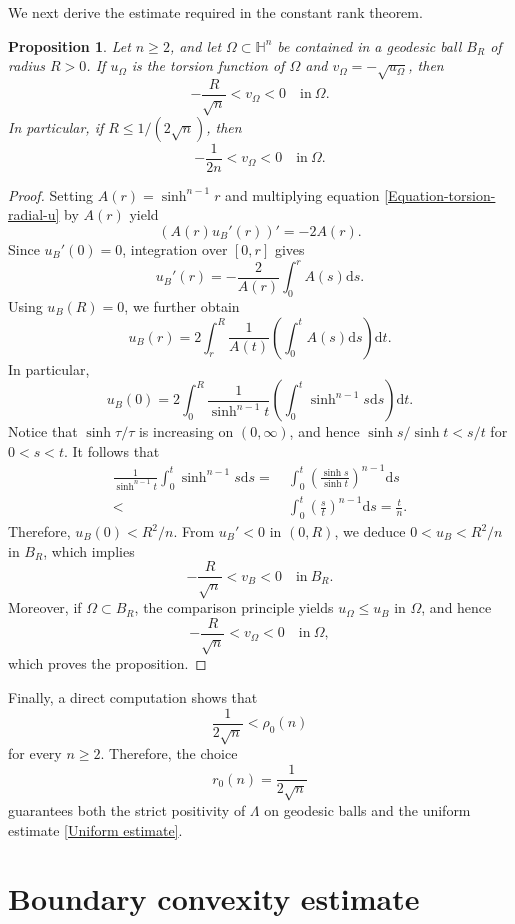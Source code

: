 \documentclass[11pt]{amsart}
\newcommand{\dd}{\mathrm{d}}
\newtheorem{proposition}[theorem]{Proposition}
\numberwithin{theorem}{section}
\numberwithin{equation}{section}
\begin{document}
We next derive the estimate required in the constant rank theorem.
\begin{proposition}\label{Proposition-uniform estimate}
Let $n\geq 2$, and let $\Omega\subset\mathbb{H}^n$ be contained in a geodesic ball $B_R$ of radius $R>0$. If $u_\Omega$ is the torsion function of $\Omega$ and $v_\Omega=-\sqrt{u_\Omega}$, then $$-\frac{R}{\sqrt{n}}<v_\Omega<0\quad\mathrm{in}\ \Omega.$$ In particular, if $R\leq 1/(2\sqrt{n})$, then
\begin{equation}\label{Uniform estimate}
-\frac{1}{2n}<v_\Omega<0\quad\mathrm{in}\ \Omega.
\end{equation}
\end{proposition}
\begin{proof}
Setting $A(r)=\sinh^{n-1}r$ and multiplying equation \eqref{Equation-torsion-radial-u} by $A(r)$ yield $$(A(r)u_B'(r))'=-2A(r).$$ Since $u_B'(0)=0$, integration over $[0,r]$ gives $$u_B'(r)=-\frac{2}{A(r)}\int_0^rA(s)\dd s.$$ Using $u_B(R)=0$, we further obtain $$u_B(r)=2\int_r^R\frac{1}{A(t)}\left(\int_0^tA(s)\dd s\right)\dd t.$$ In particular, $$u_B(0)=2\int_0^R\frac{1}{\sinh^{n-1}t}\left(\int_0^t\sinh^{n-1}s\dd s\right)\dd t.$$ Notice that $\sinh\tau/\tau$ is increasing on $(0,\infty)$, and hence $\sinh s/\sinh t<s/t$ for $0<s<t$. It follows that
\begin{align*}
\frac{1}{\sinh^{n-1}t}\int_0^t\sinh^{n-1}s\dd s
=&~\int_0^t\left(\frac{\sinh s}{\sinh t}\right)^{n-1}\dd s\\
<&~\int_0^t\left(\frac{s}{t}\right)^{n-1}\dd s=\frac{t}{n}.
\end{align*}
Therefore, $u_B(0)<R^2/n$. From $u_B'<0$ in $(0,R)$, we deduce $0<u_B<R^2/n$ in $B_R$, which implies $$-\frac{R}{\sqrt{n}}<v_B<0\quad\mathrm{in}\ B_R.$$ Moreover, if $\Omega\subset B_R$, the comparison principle yields $u_\Omega\leq u_B$ in $\Omega$, and hence $$-\frac{R}{\sqrt{n}}<v_\Omega<0\quad\mathrm{in}\ \Omega,$$ which proves the proposition.
\end{proof}

Finally, a direct computation shows that $$\frac{1}{2\sqrt{n}}<\rho_0(n)$$ for every $n\geq 2$. Therefore, the choice $$r_0(n)=\frac{1}{2\sqrt{n}}$$ guarantees both the strict positivity of $\Lambda$ on geodesic balls and the uniform estimate \eqref{Uniform estimate}.

\section{Boundary convexity estimate}\label{Section 4}
\end{document}
